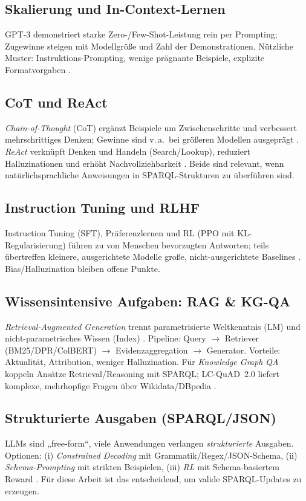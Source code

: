 \subsection{Skalierung und In-Context-Lernen}
GPT-3 \cite{brown2020language} demonstriert starke Zero-/Few-Shot-Leistung rein per Prompting; Zugewinne steigen mit Modellgröße und Zahl der Demonstrationen. Nützliche Muster: Instruktions-Prompting, wenige prägnante Beispiele, explizite Formatvorgaben \cite{brown2020language,wei2022chain}.

\subsection{CoT und ReAct}
\emph{Chain-of-Thought} (CoT) ergänzt Beispiele um Zwischenschritte und verbessert mehrschrittiges Denken; Gewinne sind v.\,a.\ bei größeren Modellen ausgeprägt \cite{wei2022chain}. \emph{ReAct} verknüpft Denken und Handeln (Search/Lookup), reduziert Halluzinationen und erhöht Nachvollziehbarkeit \cite{yao2023react}. Beide sind relevant, wenn natürlichsprachliche Anweisungen in SPARQL-Strukturen zu überführen sind.

\subsection{Instruction Tuning und RLHF}
Instruction Tuning (SFT), Präferenzlernen und RL (PPO mit KL-Regularisierung) führen zu von Menschen bevorzugten Antworten; teils übertreffen kleinere, ausgerichtete Modelle große, nicht-ausgerichtete Baselines \cite{ouyang2022training}. Bias/Halluzination bleiben offene Punkte.

\subsection{Wissensintensive Aufgaben: RAG \& KG-QA}
\emph{Retrieval-Augmented Generation} trennt parametrisierte Weltkenntnis (LM) und nicht-parametrisches Wissen (Index) \cite{lewis2020rag}. Pipeline: Query $\rightarrow$ Retriever (BM25/DPR/ColBERT) $\rightarrow$ Evidenzaggregation $\rightarrow$ Generator. Vorteile: Aktualität, Attribution, weniger Halluzination. Für \emph{Knowledge Graph QA} koppeln Ansätze Retrieval/Reasoning mit SPARQL; LC-QuAD~2.0 liefert komplexe, mehrhopfige Fragen über Wikidata/DBpedia \cite{dubey2019lcquad2}.

\subsection{Strukturierte Ausgaben (SPARQL/JSON)}
LLMs sind „free-form“, viele Anwendungen verlangen \emph{strukturierte} Ausgaben. Optionen: (i) \emph{Constrained Decoding} mit Grammatik/Regex/JSON-Schema, (ii) \emph{Schema-Prompting} mit strikten Beispielen, (iii) \emph{RL} mit Schema-basiertem Reward \cite{cong2023schema}. Für diese Arbeit ist das entscheidend, um valide SPARQL-Updates zu erzeugen.

